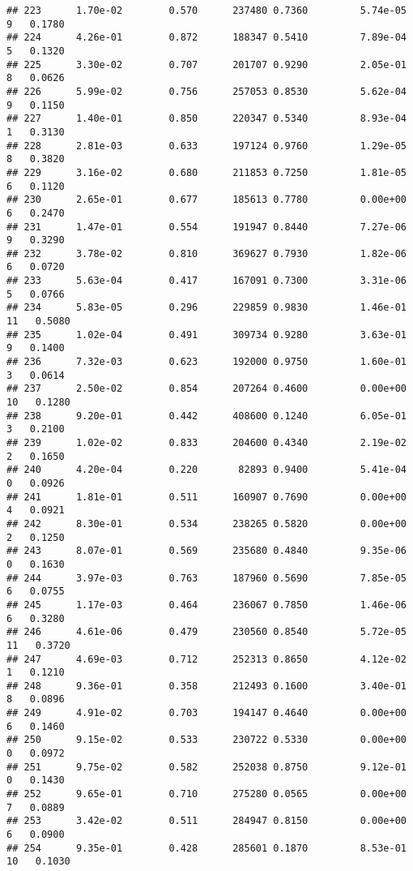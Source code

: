 \documentclass[
]{article}
\begin{document}
\begin{verbatim}
## 223      1.70e-02        0.570      237480 0.7360         5.74e-05   9   0.1780
## 224      4.26e-01        0.872      188347 0.5410         7.89e-04   5   0.1320
## 225      3.30e-02        0.707      201707 0.9290         2.05e-01   8   0.0626
## 226      5.99e-02        0.756      257053 0.8530         5.62e-04   9   0.1150
## 227      1.40e-01        0.850      220347 0.5340         8.93e-04   1   0.3130
## 228      2.81e-03        0.633      197124 0.9760         1.29e-05   8   0.3820
## 229      3.16e-02        0.680      211853 0.7250         1.81e-05   6   0.1120
## 230      2.65e-01        0.677      185613 0.7780         0.00e+00   6   0.2470
## 231      1.47e-01        0.554      191947 0.8440         7.27e-06   9   0.3290
## 232      3.78e-02        0.810      369627 0.7930         1.82e-06   6   0.0720
## 233      5.63e-04        0.417      167091 0.7300         3.31e-06   5   0.0766
## 234      5.83e-05        0.296      229859 0.9830         1.46e-01  11   0.5080
## 235      1.02e-04        0.491      309734 0.9280         3.63e-01   9   0.1400
## 236      7.32e-03        0.623      192000 0.9750         1.60e-01   3   0.0614
## 237      2.50e-02        0.854      207264 0.4600         0.00e+00  10   0.1280
## 238      9.20e-01        0.442      408600 0.1240         6.05e-01   3   0.2100
## 239      1.02e-02        0.833      204600 0.4340         2.19e-02   2   0.1650
## 240      4.20e-04        0.220       82893 0.9400         5.41e-04   0   0.0926
## 241      1.81e-01        0.511      160907 0.7690         0.00e+00   4   0.0921
## 242      8.30e-01        0.534      238265 0.5820         0.00e+00   2   0.1250
## 243      8.07e-01        0.569      235680 0.4840         9.35e-06   0   0.1630
## 244      3.97e-03        0.763      187960 0.5690         7.85e-05   6   0.0755
## 245      1.17e-03        0.464      236067 0.7850         1.46e-06   6   0.3280
## 246      4.61e-06        0.479      230560 0.8540         5.72e-05  11   0.3720
## 247      4.69e-03        0.712      252313 0.8650         4.12e-02   1   0.1210
## 248      9.36e-01        0.358      212493 0.1600         3.40e-01   8   0.0896
## 249      4.91e-02        0.703      194147 0.4640         0.00e+00   6   0.1460
## 250      9.15e-02        0.533      230722 0.5330         0.00e+00   0   0.0972
## 251      9.75e-02        0.582      252038 0.8750         9.12e-01   0   0.1430
## 252      9.65e-01        0.710      275280 0.0565         0.00e+00   7   0.0889
## 253      3.42e-02        0.511      284947 0.8150         0.00e+00   6   0.0900
## 254      9.35e-01        0.428      285601 0.1870         8.53e-01  10   0.1030

\end{verbatim}
\end{document}
